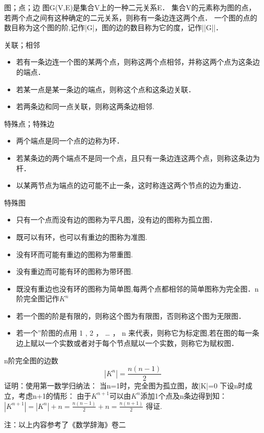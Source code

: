 
\begin{issues}
\end{issues}



\begin{definition}{图；点；边}
图G(V,E)是集合V上的一种二元关系E．
集合V的元素称为图的点，若两个点之间有这种确定的二元关系，则称有一条边连这两个点．
一个图的点的数目称为这个图的阶,记作|G|，图的边的数目称为它的度，记作||G||．
\end{definition}

\begin{definition}{关联；相邻}
\begin{itemize}
\item 若有一条边连一个图的某两个点，则称这两个点相邻，并称这两个点为这条边的端点．
\item 若某一点是某一条边的端点，则称这个点和这条边关联．
\item 若两条边和同一点关联，则称这两条边相邻.
\end{itemize}
\end{definition}
\begin{definition}{特殊点；特殊边}
\begin{itemize}
\item 两个端点是同一个点的边称为环．
\item 若某条边的两个端点不是同一个点，且只有一条边连这两个点，则称这条边为杆．
\item 以某两节点为端点的边可能不止一条，这时称连这两个节点的边为重边．
\end{itemize}
\end{definition}
\begin{definition}{特殊图}
\begin{itemize}
\item 只有一个点而没有边的图称为平凡图，没有边的图称为孤立图．
\item 既可以有环，也可以有重边的图称为准图.
\item 没有环而可能有重边的图称为带重图.
\item 没有重边而可能有环的图称为带环图.
\item 既没有重边也没有环的图称为简单图,每两个点都相邻的简单图称为完全图．n阶完全图记作$K^{n}$
\item 若一个图的阶是有限的，则称这个图为有限图，否则称这个图为无限图．
\item 若一个”阶图的点用 1 , 2 ， … ， n 来代表，则称它为标定图,若在图的每一条边上赋以一个实数或者对于每个节点赋以一个实数，则称它为赋权图．
\end{itemize}
\end{definition}
\begin{theorem}{n阶完全图的边数}
\begin{equation}
|K^{n}|=\frac{n(n-1)}{2}
\end{equation}
证明：使用第一数学归纳法：
当n=1时，完全图为孤立图，故|K|=0
下设n时成立，考虑n+1的情形：
由于$K^{n+1}$可以由$K^{n}$添加1个点及n条边得到知：
$|K^{n+1}|=|K^{n}|+n=\frac{n(n-1)}{2}+n=\frac{n(n+1)}{2}$
得证.
\end{theorem}
注：以上内容参考了《数学辞海》卷二